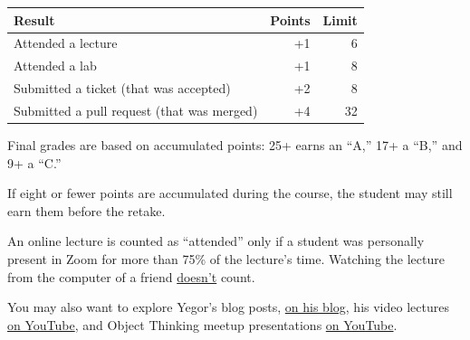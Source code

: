 \documentclass[nobrand,anonymous,nodate,nosecurity]{huawei}
\begin{document}
\renewcommand{\arraystretch}{1}
\begin{tabular}{lrr}
\toprule
Result & Points & Limit \\
\midrule
Attended a lecture & +1 & 6 \\
Attended a lab & +1 & 8 \\
Submitted a ticket (that was accepted) & +2 & 8 \\
Submitted a pull request (that was merged) & +4 & 32 \\
\bottomrule
\end{tabular}

Final grades are based on accumulated points: 25+ earns an ``A,'' 17+ a ``B,'' and 9+ a ``C.''

If eight or fewer points are accumulated during the course, the student may still earn them before the retake.

An online lecture is counted as ``attended'' only if a student was personally present in Zoom for more than 75\% of the lecture's time.
Watching the lecture from the computer of a friend \ul{doesn't} count.

\newpage
\renewcommand\refname{Learning Materials}
\printbibliography

You may also want to explore Yegor's blog posts, \href{https://www.yegor256.com/tag/oop}{on his blog}, his video lectures \href{https://www.youtube.com/playlist?list=PLaIsQH4uc08yw2CsNv5OV30GfKE6XVGii}{on YouTube}, and Object Thinking meetup presentations \href{https://www.youtube.com/watch?v=yT6oO28wEik&list=PLaIsQH4uc08yetzX86w1pPck1QtGEy_ik}{on YouTube}.
\end{document}
